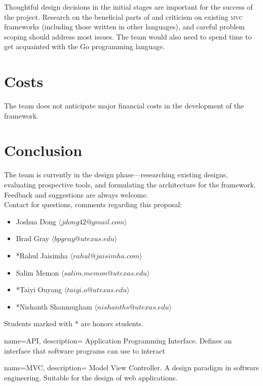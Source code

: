 \documentclass{article}
\begin{document}
Thoughtful design decisions in the initial stages are important for the success of the project. Research on the beneficial parts of and criticism on existing \textsc{mvc} frameworks (including those written in other languages), and careful problem scoping should address most issues. The team would also need to spend time to get acquainted with the Go programming language.

\section{Costs}

The team does not anticipate major financial costs in the development of the framework. 

\section{Conclusion}

The team is currently in the design phase---researching existing designs, evaluating prospective tools, and formulating the architecture for the framework. Feedback and suggestions are always welcome.\\


Contact for questions, comments regarding this proposal: 

\begin{itemize}
    \item Joshua Dong $\langle jdong42@gmail.com \rangle$
    \item Brad Gray $\langle bpgray@utexas.edu \rangle$
    \item *Rahul Jaisimha $\langle rahul@jaisimha.com \rangle$
    \item Salim Memon $\langle salim.memon@utexas.edu  \rangle$
    \item *Taiyi Ouyang $\langle taiyi.o@utexas.edu \rangle$
    \item *Nishanth Shanmugham $\langle nishanths@utexas.edu \rangle$
\end{itemize}

Students marked with * are honors students.

{
  name=API,
  description={
    Application Programming Interface. Defines an interface that software programs can use to interact
  }
}

{
  name=MVC,
  description={
    Model View Controller. A design paradigm in software engineering. Suitable for the design of web applications.
  }
}
\end{document}
